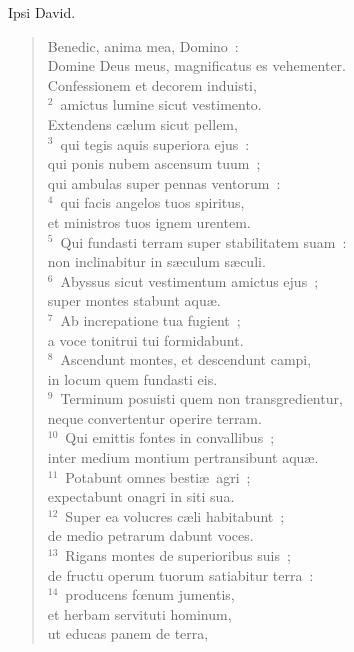 \bchapter
\lettrine[lines=3,image=true,loversize=0.05,lraise=-0.03]{I}{}psi David. \begin{flushleft}\begin{verse}\vspace{6pt}Benedic, anima mea, Domino~:\\ Domine Deus meus, magnificatus es vehementer.\\ Confessionem et decorem induisti,\\
${}^{2}$~amictus lumine sicut vestimento.\\ Extendens c\ae lum sicut pellem,\\
${}^{3}$~qui tegis aquis superiora ejus~:\\ qui ponis nubem ascensum tuum~;\\ qui ambulas super pennas ventorum~:\\
${}^{4}$~qui facis angelos tuos spiritus,\\ et ministros tuos ignem urentem.\\
${}^{5}$~Qui fundasti terram super stabilitatem suam~:\\ non inclinabitur in s\ae culum s\ae culi.\\
${}^{6}$~Abyssus sicut vestimentum amictus ejus~;\\ super montes stabunt aqu\ae .\\
${}^{7}$~Ab increpatione tua fugient~;\\ a voce tonitrui tui formidabunt.\\
${}^{8}$~Ascendunt montes, et descendunt campi,\\ in locum quem fundasti eis.\\
${}^{9}$~Terminum posuisti quem non transgredientur,\\ neque convertentur operire terram.\\
${}^{10}$~Qui emittis fontes in convallibus~;\\ inter medium montium pertransibunt aqu\ae .\\
${}^{11}$~Potabunt omnes besti\ae\ agri~;\\ expectabunt onagri in siti sua.\\
${}^{12}$~Super ea volucres c\ae li habitabunt~;\\ de medio petrarum dabunt voces.\\
${}^{13}$~Rigans montes de superioribus suis~;\\ de fructu operum tuorum satiabitur terra~:\\
${}^{14}$~producens fœnum jumentis,\\ et herbam servituti hominum,\\ ut educas panem de terra,\\

\end{verse}
\end{flushleft}
